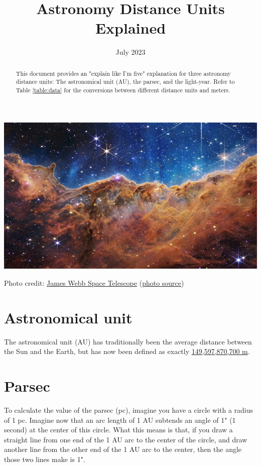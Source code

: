 \documentclass{article}
\title{Astronomy Distance Units Explained}
\date{July 2023}
\begin{document}
\maketitle
\begin{center}
    \includegraphics{james-webb-space-telescope-carina-nebula.jpg}
\end{center}

\noindent Photo credit: \href{https://webb.nasa.gov/}{James Webb Space Telescope}
(\href{https://www.flickr.com/photos/nasawebbtelescope/52259221868/in/album-72177720300469752/}{photo source})

\begin{abstract}
    \noindent This document provides an "explain like I'm five" explanation for three astronomy distance units:
    \noindent The astronomical unit (AU), the parsec, and the light-year. Refer to Table
    \noindent \ref{table:data} for the conversions between different distance units and meters.
\end{abstract}

\section*{Astronomical unit}  %
The astronomical unit (AU) has traditionally been the average distance between the Sun and the
Earth, but has now been defined as exactly
\href{https://www.iau.org/static/resolutions/IAU2012_English.pdf}{149,597,870,700 m}.

\section*{Parsec}
To calculate the value of the parsec (pc), imagine you have a circle with a radius of 1 pc. Imagine
now that an arc length of 1 AU subtends an angle of 1" (1 second) at the center of this circle. What
this means is that, if you draw a straight line from one end of the 1 AU arc to the center of the
circle, and draw another line from the other end of the 1 AU arc to the center, then the angle
those two lines make is 1". \\
\end{document}
